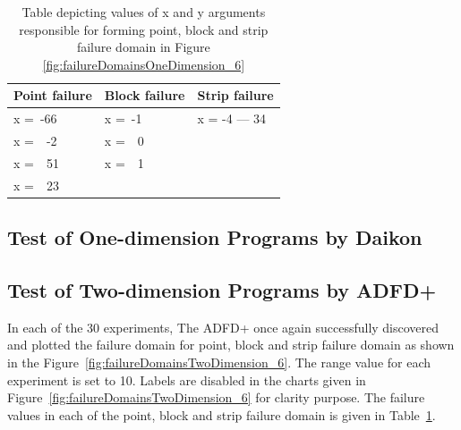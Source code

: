 \begin{table}[h]
\caption{Table depicting values of x and y arguments responsible for forming point, block and strip failure domain in Figure \ref{fig:failureDomainsOneDimension_6}}
\bigskip
\centering
{\renewcommand{\arraystretch}{1.3}
\begin{tabular}{|l|l|l|}
\hline
Point failure		& 	Block failure		& 	Strip failure		\\
\hline
x =~-66			&	x =~-1			&	x = -4 --- 34 	\\	
x =~~-2		 	&	x =~~0			&					\\	
x =~~51 		&	x =~~1			&					\\
x =~~23 		& 	 				& 					\\
\hline
\end{tabular}
}
\bigskip
\label{table:failureDomains_6}
\end{table}



\subsection{Test of One-dimension Programs by Daikon}


\subsection{Test of Two-dimension Programs by ADFD+}\label{sec:intro6_11}
In each of the 30 experiments, The ADFD+ once again successfully discovered and plotted the failure domain for point, block and strip failure domain as shown in the Figure~\ref{fig:failureDomainsTwoDimension_6}. The range value for each experiment is set to 10. Labels are disabled in the charts given in Figure~\ref{fig:failureDomainsTwoDimension_6} for clarity purpose. The failure values in each of the point, block and strip failure domain is given in Table~\ref{table:failureDomains_6}. 

